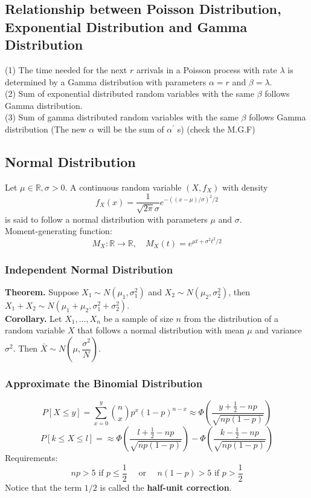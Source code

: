 \documentclass[a4paper,12pt]{article}
\begin{document}
\subsection{Relationship between Poisson Distribution, Exponential Distribution and Gamma Distribution}
(1) The time needed for the next $r$ arrivals in a Poisson process with rate $\lambda$ is determined by a Gamma distribution with parameters $\alpha=r$ and $\beta=\lambda$.\\
(2) Sum of exponential distributed random variables with the same $\beta$ follows Gamma distribution.\\
(3) Sum of gamma distributed random variables with the same $\beta$ follows Gamma distribution (The new $\alpha$ will be the sum of $\alpha^{\prime}$ s) (check the M.G.F)
    

\subsection{Normal Distribution}
Let $\mu \in \mathbb{R}, \sigma>0$. A continuous random variable $\left(X, f_X\right)$ with density
\begin{equation}
f_X(x)=\dfrac{1}{\sqrt{2 \pi} \sigma} e^{-((x-\mu) / \sigma)^2 / 2}
\end{equation}
is said to follow a normal distribution with parameters $\mu$ and $\sigma$.\\
Moment-generating function:
$$
M_X: \mathbb{R} \rightarrow \mathbb{R}, \quad M_X(t)=e^{\mu t+\sigma^2 t^2 / 2}
$$
\subsubsection{Independent Normal Distribution}
    \textbf{Theorem.} Suppose $X_1 \sim N(\mu_1, \sigma_1^2)$ and $X_2 \sim N(\mu_2, \sigma_2^2)$, then $X_1+X_2 \sim N(\mu_1+\mu_2, \sigma_1^2+\sigma_2^2)$. \\
    \textbf{Corollary.} Let $X_1, \ldots, X_n$ be a sample of size $n$ from the distribution of a random variable $X$ that follows a normal distribution with mean $\mu$ and variance $\sigma^2$. Then $\bar{X} \sim  N(\mu, \dfrac{\sigma^2}{N})$.
\subsubsection{Approximate the Binomial Distribution}
    \begin{equation}
        P[X\leq y]=\sum_{x=0}^{y}\binom{n}{x}p^x(1-p)^{n-x}\approx \Phi(\dfrac{y+\frac{1}{2}-np}{\sqrt{np(1-p)}}) 
    \end{equation}
    \begin{equation}
        P[k \leq X\leq l]=\approx \Phi(\dfrac{l+\frac{1}{2}-np}{\sqrt{np(1-p)}}) - \Phi(\dfrac{k-\frac{1}{2}-np}{\sqrt{np(1-p)}}) 
    \end{equation}
    Requirements:
    $$
n p>5 \text { if } p \leq \frac{1}{2} \quad \text { or } \quad n(1-p)>5 \text { if } p>\frac{1}{2}
$$
Notice that the term $1/2$ is called the \textbf{half-unit correction}.
\end{document}
